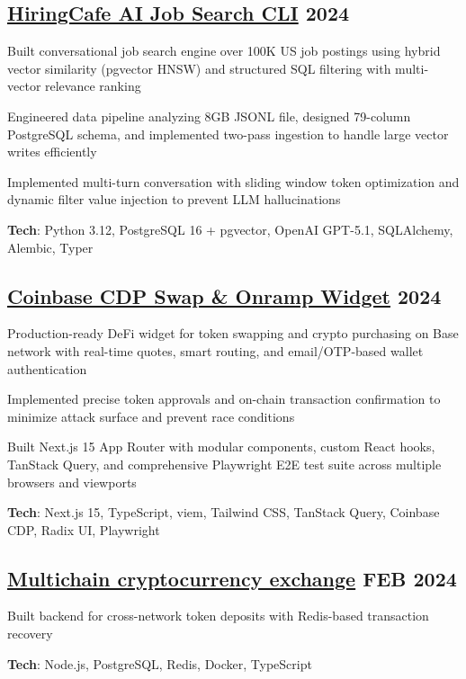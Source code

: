 \documentclass[letter,10pt]{article}
\begin{document}
\subsection{{ \href{https://github.com/Suhel-Kap/hiringcafe-dataset-job-search}{HiringCafe AI Job Search CLI} \hfill 2024}}
\begin{zitemize}
  \item Built conversational job search engine over 100K US job postings using hybrid vector similarity (pgvector HNSW) and structured SQL filtering with multi-vector relevance ranking
  \item Engineered data pipeline analyzing 8GB JSONL file, designed 79-column PostgreSQL schema, and implemented two-pass ingestion to handle large vector writes efficiently
  \item Implemented multi-turn conversation with sliding window token optimization and dynamic filter value injection to prevent LLM hallucinations
  \item \textbf{Tech}: Python 3.12, PostgreSQL 16 + pgvector, OpenAI GPT-5.1, SQLAlchemy, Alembic, Typer
\end{zitemize}

\subsection{{ \href{https://github.com/Suhel-Kap/coinbase-swap-widget}{Coinbase CDP Swap \& Onramp Widget} \hfill 2024}}
\begin{zitemize}
  \item Production-ready DeFi widget for token swapping and crypto purchasing on Base network with real-time quotes, smart routing, and email/OTP-based wallet authentication
  \item Implemented precise token approvals and on-chain transaction confirmation to minimize attack surface and prevent race conditions
  \item Built Next.js 15 App Router with modular components, custom React hooks, TanStack Query, and comprehensive Playwright E2E test suite across multiple browsers and viewports
  \item \textbf{Tech}: Next.js 15, TypeScript, viem, Tailwind CSS, TanStack Query, Coinbase CDP, Radix UI, Playwright
\end{zitemize}

\subsection{{ \href{https://github.com/Suhel-Kap/crypto-exchanger}{Multichain cryptocurrency exchange} \hfill FEB 2024}}
\begin{zitemize}
  \item Built backend for cross-network token deposits with Redis-based transaction recovery
  \item \textbf{Tech}: Node.js, PostgreSQL, Redis, Docker, TypeScript
\end{zitemize}
\end{document}
